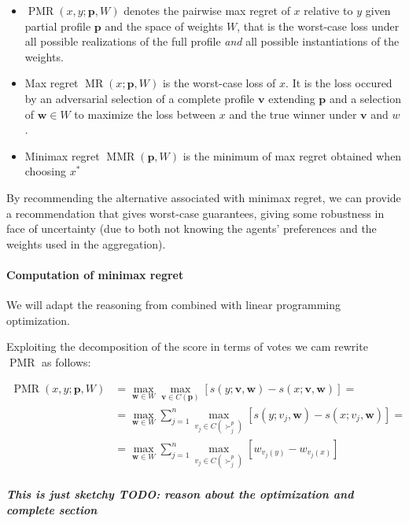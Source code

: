 \documentclass[12pt]{article}
\newcommand{\profile}{\textbf{v}}%
\newcommand{\pprofile}{\textbf{p}}%
\newcommand{\w}{\textbf{w}}%
\DeclareMathOperator{\PMR}{PMR}
\DeclareMathOperator{\MR}{MR}
\DeclareMathOperator{\MMR}{MMR}
\begin{document}
\begin{itemize}
 \item $\PMR(x,y;\pprofile,W)$ denotes the pairwise max regret of $x$ relative to $y$ given partial profile $\pprofile$ and the space of weights $W$, that is the worst-case loss under all possible realizations of the full profile {\em and} all possible instantiations of the weights.
 \item Max regret $\MR(x;\pprofile,W)$ is the worst-case loss of $x$. It is the loss occured by an adversarial selection of a complete profile $\profile$ extending $\pprofile$ and a selection of $\w \in W$ to maximize the loss between $x$ and the true winner under $\profile$ and $w$.
 \item Minimax regret $\MMR(\pprofile,W)$ is the minimum of max regret obtained when choosing $x^*$
\end{itemize}
By recommending the alternative associated with minimax regret, we can provide a recommendation that gives worst-case guarantees, giving some robustness in face of uncertainty (due to both not knowing the agents' preferences and the weights used in the aggregation).

\paragraph{Computation of minimax regret}

We will adapt the reasoning from \cite{Lu2011} combined with linear programming optimization.

Exploiting the decomposition of the score in terms of votes we cam rewrite $\PMR$ as follows:

\begin{align*}
\PMR(x,y; \pprofile, W) &= \max_{\w \in W} \max_{\profile \in C(\pprofile)} [ s(y; \profile,\w) - s(x; \profile,\w) ] = \\
&=  \max_{\w \in W} \sum_{j=1}^{n} \max_{v_j \in C(\succ_j^p)} [s(y; v_j,\w) - s(x; v_j,\w)]=\\
&=  \max_{\w \in W} \sum_{j=1}^{n} \max_{v_j \in C(\succ_j^p)} [w_{v_j(y)} - w_{v_j(x)}] \\
\end{align*}

{\bf \em This is just sketchy TODO: reason about the optimization and complete section}
\end{document}
